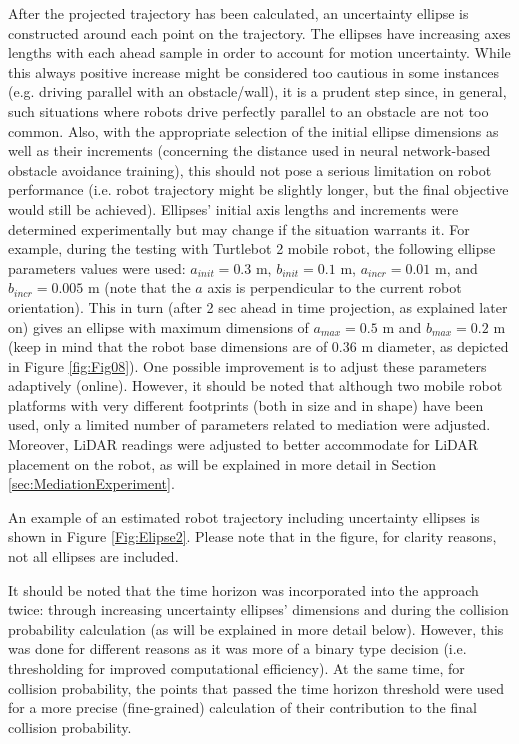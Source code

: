 After the projected trajectory has been calculated, an uncertainty ellipse is constructed around each point on the trajectory. The ellipses have increasing axes lengths with each ahead sample in order to account for motion uncertainty. While this always positive increase might be considered too cautious in some instances (e.g. driving parallel with an obstacle/wall), it is a prudent step since, in general, such situations where robots drive perfectly parallel to an obstacle are not too common. Also, with the appropriate selection of the initial ellipse dimensions as well as their increments (concerning the distance used in neural network-based obstacle avoidance training), this should not pose a serious limitation on robot performance (i.e. robot trajectory might be slightly longer, but the final objective would still be achieved). Ellipses' initial axis lengths and increments were determined experimentally but may change if the situation warrants it. For example, during the testing with Turtlebot 2 mobile robot, the following ellipse parameters values were used: $a_{init} = 0.3$ m, $b_{init} = 0.1$ m, $a_{incr} = 0.01$ m, and $b_{incr} = 0.005$ m (note that the $a$ axis is perpendicular to the current robot orientation). This in turn (after 2 sec ahead in time projection, as explained later on) gives an ellipse with maximum dimensions of $a_{max} = 0.5$ m and $b_{max} = 0.2$ m (keep in mind that the robot base dimensions are of 0.36 m diameter, as depicted in Figure \ref{fig:Fig08}). One possible improvement is to adjust these parameters adaptively (online). However, it should be noted that although two mobile robot platforms with very different footprints (both in size and in shape) have been used, only a limited number of parameters related to mediation were adjusted. Moreover, LiDAR readings were adjusted to better accommodate for LiDAR placement on the robot, as will be explained in more detail in Section \ref{sec:MediationExperiment}. 

An example of an estimated robot trajectory including uncertainty ellipses is shown in Figure \ref{Fig:Elipse2}. Please note that in the figure, for clarity reasons, not all ellipses are included. 

It should be noted that the time horizon was incorporated into the approach twice: through increasing uncertainty ellipses' dimensions and during the collision probability calculation (as will be explained in more detail below). However, this was done for different reasons as it was more of a binary type decision (i.e. thresholding for improved computational efficiency). At the same time, for collision probability, the points that passed the time horizon threshold were used for a more precise (fine-grained) calculation of their contribution to the final collision probability.

